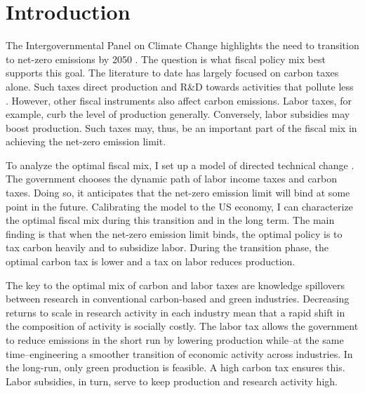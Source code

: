 \clearpage
\section{Introduction}




The Intergovernmental Panel on Climate Change highlights the need to transition to net-zero emissions by 2050 \citep{IPCC2022}. The question is what fiscal policy mix best supports this goal. The literature to date has largely focused on carbon taxes alone. Such taxes direct production and R\&D towards activities that pollute less \citep{Acemoglu2012TheChange}. However, other fiscal instruments also affect carbon emissions. Labor taxes, for example, curb the level of production generally. Conversely, labor subsidies may boost production. Such taxes may, thus, be an important part of the fiscal mix in achieving the  net-zero emission limit.

To analyze the optimal fiscal mix, I set up a model of directed technical change \citep{Acemoglu2002DirectedChange, Acemoglu2012TheChange}. The government chooses the dynamic path of labor income taxes and carbon taxes. Doing so, it anticipates that the net-zero emission limit will bind at some point in the future. Calibrating the model to the US economy, I can characterize the optimal fiscal mix during this transition and in the long term. The main finding is that when the net-zero emission limit binds, the optimal policy is to tax carbon heavily and to subsidize labor. During the transition phase, the optimal carbon tax is lower and a tax on labor reduces production. 

The key to the optimal mix of carbon and labor taxes are knowledge spillovers between research in conventional carbon-based and green industries. Decreasing returns to scale in research activity in each industry mean that a rapid shift in the composition of activity is socially costly. The labor tax allows the government to reduce emissions in the short run by  lowering production while–at the same time–engineering a smoother transition of economic activity across industries. In the long-run, only green production is feasible. A high carbon tax ensures this. Labor subsidies, in turn, serve to keep production and research activity high.

